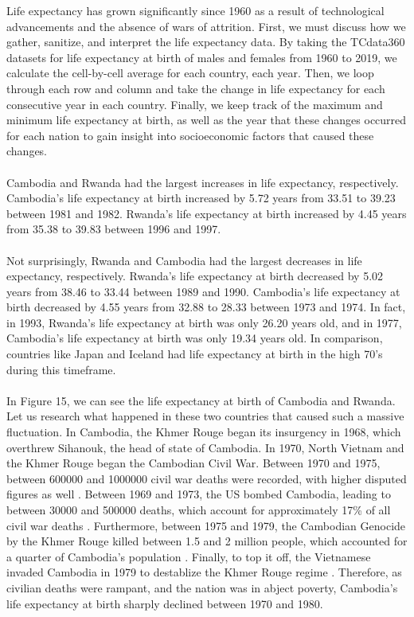 \documentclass[15pt]{article}
\begin{document}
Life expectancy has grown significantly since 1960 as a result of technological advancements and the absence of wars of attrition. First, we must discuss how we gather, sanitize, and interpret the life expectancy data. By taking the TCdata360 datasets \cite{2} for life expectancy at birth of males and females from 1960 to 2019, we calculate the cell-by-cell average for each country, each year. Then, we loop through each row and column and take the change in life expectancy for each consecutive year in each country. Finally, we keep track of the maximum and minimum life expectancy at birth, as well as the year that these changes occurred for each nation to gain insight into socioeconomic factors that caused these changes.\\
\\
Cambodia and Rwanda had the largest increases in life expectancy, respectively. Cambodia's life expectancy at birth increased by 5.72 years from 33.51 to 39.23 between 1981 and 1982. Rwanda's life expectancy at birth increased by 4.45 years from 35.38 to 39.83 between 1996 and 1997.\\
\\
Not surprisingly, Rwanda and Cambodia had the largest decreases in life expectancy, respectively. Rwanda's life expectancy at birth decreased by 5.02 years from 38.46 to 33.44 between 1989 and 1990. Cambodia's life expectancy at birth decreased by 4.55 years from 32.88 to 28.33 between 1973 and 1974. In fact, in 1993, Rwanda's life expectancy at birth was only 26.20 years old, and in 1977, Cambodia's life expectancy at birth was only 19.34 years old. In comparison, countries like Japan and Iceland had life expectancy at birth in the high 70's during this timeframe.\\
\\
In Figure 15, we can see the life expectancy at birth of Cambodia and Rwanda. Let us research what happened in these two countries that caused such a massive fluctuation. In Cambodia, the Khmer Rouge began its insurgency in 1968, which overthrew Sihanouk, the head of state of Cambodia. In 1970, North Vietnam and the Khmer Rouge began the Cambodian Civil War. Between 1970 and 1975, between 600000 and 1000000 civil war deaths were recorded, with higher disputed figures as well \cite{8}. Between 1969 and 1973, the US bombed Cambodia, leading to between 30000 and 500000 deaths, which account for approximately 17\% of all civil war deaths \cite{8}. Furthermore, between 1975 and 1979, the Cambodian Genocide by the Khmer Rouge killed between 1.5 and 2 million people, which accounted for a quarter of Cambodia's population \cite{9}. Finally, to top it off, the Vietnamese invaded Cambodia in 1979 to destablize the Khmer Rouge regime \cite{8}. Therefore, as civilian deaths were rampant, and the nation was in abject poverty, Cambodia's life expectancy at birth sharply declined between 1970 and 1980.\\
\end{document}
